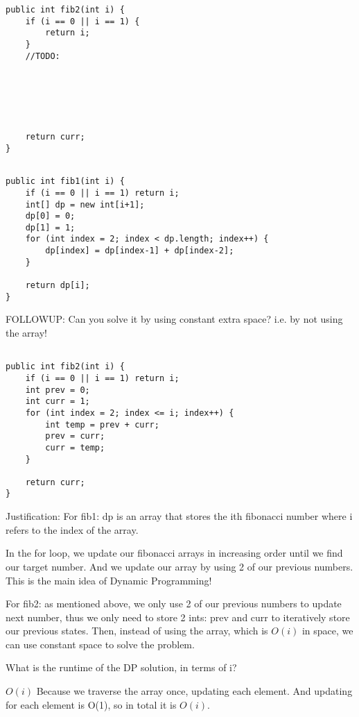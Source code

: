 \begin{parts}
\begin{lstlisting}
public int fib2(int i) {
    if (i == 0 || i == 1) {
        return i;
    }
    //TODO:
    
    
    
    
    
    
    return curr;
}
\end{lstlisting}
\fi

\begin{solution}
\begin{lstlisting}

public int fib1(int i) {
    if (i == 0 || i == 1) return i;
    int[] dp = new int[i+1];
    dp[0] = 0;
    dp[1] = 1;
    for (int index = 2; index < dp.length; index++) {
        dp[index] = dp[index-1] + dp[index-2];
    }

    return dp[i];
}
\end{lstlisting}

\newpage

FOLLOWUP: Can you solve it by using constant extra space? i.e. by not using the array!
\begin{lstlisting}

public int fib2(int i) {
    if (i == 0 || i == 1) return i;
    int prev = 0;
    int curr = 1;
    for (int index = 2; index <= i; index++) {
        int temp = prev + curr;
        prev = curr;
        curr = temp;
    }

    return curr;
}
\end{lstlisting}

Justification:
    For fib1: dp is an array that stores the ith fibonacci number where i refers to the index of the array.
    
    In the for loop, we update our fibonacci arrays in increasing order until we find our target number. And we update our array by using 2 of our previous numbers. This is the main idea of Dynamic Programming!
    
    For fib2: as mentioned above, we only use 2 of our previous numbers to update next number, thus we only need to store 2 ints: prev and curr to iteratively store our previous states.
    Then, instead of using the array, which is $O(i)$ in space, we can use constant space to solve the problem.
\end{solution}

\item What is the runtime of the DP solution, in terms of i?
\begin{solution}
$O(i)$ Because we traverse the array once, updating each element. And updating for each element is O(1), so in total it is $O(i)$.
\end{solution}



\end{parts}

